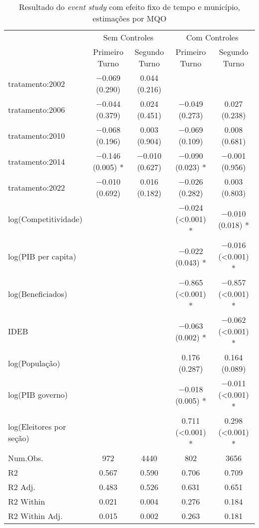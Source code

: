 \begin{table}
\centering
\begin{tabular}[t]{lcccc}
\toprule
& \multicolumn{2}{c}{Sem Controles} & \multicolumn{2}{c}{Com Controles} \\
  \cmidrule(lr){2-3} \cmidrule(lr){4-5}
  & Primeiro Turno & Segundo Turno & Primeiro Turno & Segundo Turno\\
\midrule
tratamento:2002 & \num{-0.069} (\num{0.290}) & \num{0.044} (\num{0.216}) &  & \\
tratamento:2006 & \num{-0.044} (\num{0.379}) & \num{0.024} (\num{0.451}) & \num{-0.049} (\num{0.273}) & \num{0.027} (\num{0.238})\\
tratamento:2010 & \num{-0.068} (\num{0.196}) & \num{0.003} (\num{0.904}) & \num{-0.069} (\num{0.109}) & \num{0.008} (\num{0.681})\\
tratamento:2014 & \num{-0.146} (\num{0.005}) * & \num{-0.010} (\num{0.627}) & \num{-0.090} (\num{0.023}) * & \num{-0.001} (\num{0.956})\\
tratamento:2022 & \num{-0.010} (\num{0.692}) & \num{0.016} (\num{0.182}) & \num{-0.026} (\num{0.282}) & \num{0.003} (\num{0.803})\\
log(Competitividade) &  &  & \num{-0.024} (\num{<0.001}) * & \num{-0.010} (\num{0.018}) *\\
log(PIB per capita) &  &  & \num{-0.022} (\num{0.043}) * & \num{-0.016} (\num{<0.001}) *\\
log(Beneficiados) &  &  & \num{-0.865} (\num{<0.001}) * & \num{-0.857} (\num{<0.001}) *\\
IDEB &  &  & \num{-0.063} (\num{0.002}) * & \num{-0.062} (\num{<0.001}) *\\
log(População) &  &  & \num{0.176} (\num{0.287}) & \num{0.164} (\num{0.089})\\
log(PIB governo) &  &  & \num{-0.018} (\num{0.005}) * & \num{-0.011} (\num{<0.001}) *\\
log(Eleitores por seção) &  &  & \num{0.711} (\num{<0.001}) * & \num{0.298} (\num{<0.001}) *\\
\midrule
Num.Obs. & \num{972} & \num{4440} & \num{802} & \num{3656}\\
R2 & \num{0.567} & \num{0.590} & \num{0.706} & \num{0.709}\\
R2 Adj. & \num{0.483} & \num{0.526} & \num{0.631} & \num{0.651}\\
R2 Within & \num{0.021} & \num{0.004} & \num{0.276} & \num{0.184}\\
R2 Within Adj. & \num{0.015} & \num{0.002} & \num{0.263} & \num{0.181}\\
\bottomrule
\end{tabular}
\caption{Resultado do \textit{event study} com efeito fixo de tempo e município, estimações por MQO}
\label{tab_eventStud}
\end{table}